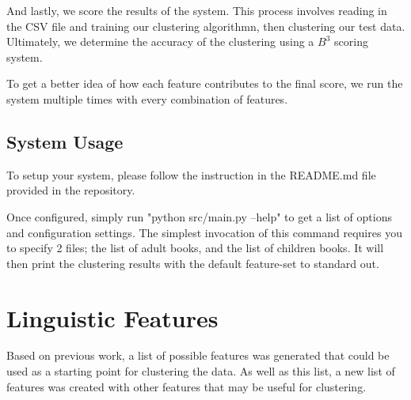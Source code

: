 \documentclass[]{article}
\begin{document}
And lastly, we score the results of the system.
This process involves reading in the CSV file and training our clustering algorithmn, then clustering our test data.
Ultimately, we determine the accuracy of the clustering using a $B^3$ scoring system.

To get a better idea of how each feature contributes to the final score, we run the system multiple times with every combination of features.

\subsection{System Usage}

To setup your system, please follow the instruction in the README.md file provided in the repository.

Once configured, simply run "python src/main.py --help" to get a list of options and configuration settings.
The simplest invocation of this command requires you to specify 2 files; the list of adult books, and the list of children books.
It will then print the clustering results with the default feature-set to standard out.

\section{Linguistic Features}

Based on previous work, a list of possible features was generated that could be used as a starting point for clustering the data.
As well as this list, a new list of features was created with other features that may be useful for clustering.
\end{document}
